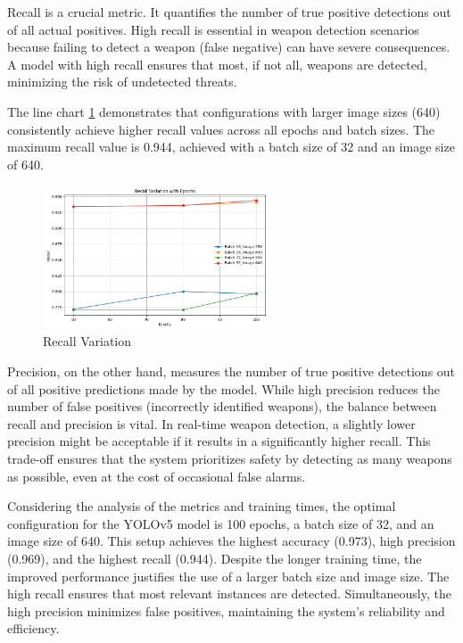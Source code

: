Recall is a crucial metric. It quantifies the number of true 
positive detections out of all actual positives. High recall is essential in weapon detection scenarios because 
failing to detect a weapon (false negative) can have severe consequences. A model with high recall ensures that 
most, if not all, weapons are detected, minimizing the risk of undetected threats.

The line chart \ref{fig:recall-variation} demonstrates that configurations with larger image sizes (640) consistently 
achieve higher recall values across all epochs and batch sizes. The maximum recall value is 0.944, achieved with a 
batch size of 32 and an image size of 640.

\begin{figure}[h]
    \centering 
    \includegraphics[width=0.6\textwidth]{figs/recall-variation.png} 
    \caption{Recall Variation}
    \label{fig:recall-variation}
\end{figure}

Precision, on the other hand, measures the number of true positive detections out of all positive predictions made 
by the model. While high precision reduces the number of false positives (incorrectly identified weapons), the 
balance between recall and precision is vital. In real-time weapon detection, a slightly lower precision might 
be acceptable if it results in a significantly higher recall. This trade-off ensures that the system prioritizes 
safety by detecting as many weapons as possible, even at the cost of occasional false alarms.

Considering the analysis of the metrics and training times, the optimal configuration for the YOLOv5 
model is 100 epochs, a batch size of 32, and an image size of 640. This 
setup achieves the highest accuracy (0.973), high precision (0.969), and the highest recall (0.944). 
Despite the longer training time, the improved performance justifies the use of a larger batch size and image size.
The high recall ensures that most relevant instances are detected. Simultaneously, the high precision minimizes 
false positives, maintaining the system's reliability and efficiency.

